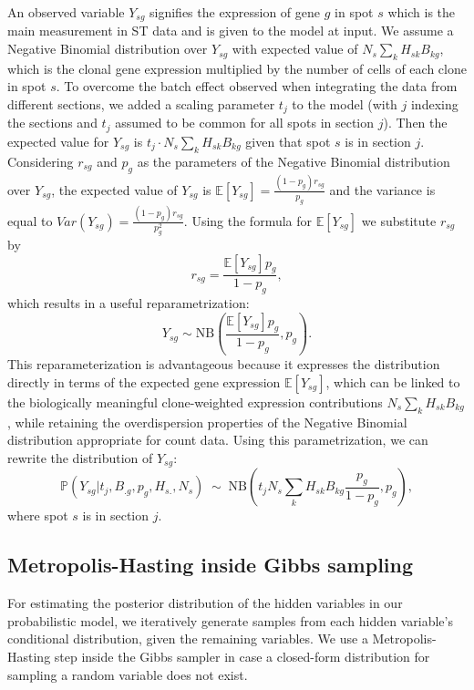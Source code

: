 \documentclass[unnumsec,webpdf,contemporary,large]{oup-authoring-template}%
\theoremstyle{thmstyleone}%
\theoremstyle{thmstyletwo}%
\theoremstyle{thmstylethree}%
\newcommand{\rev}[1]{{\color{revisionblue}#1}}
\begin{document}
\begin{methods}
An observed variable $Y_{sg}$ signifies the expression of gene $g$ in spot $s$ which is the main measurement in ST data and is given to the model at input. We assume a Negative Binomial distribution over $Y_{sg}$ with expected value of $N_s\sum_{k}{H_{sk}B_{kg}}$, which is the clonal gene expression multiplied by the number of cells of each clone in spot $s$. To overcome the batch effect observed when integrating the data from different sections, we added a scaling parameter $t_j$ to the model (with $j$ indexing the sections and $t_j$  assumed to be common for all spots in  section $j$). Then the expected value for $Y_{sg}$ is $t_j \cdot N_s\sum_{k}{H_{sk}B_{kg}}$ given that spot $s$ is in section $j$. Considering $r_{sg}$ and $p_{g}$ as the parameters of the Negative Binomial distribution over $Y_{sg}$, the expected value of $Y_{sg}$ is $\mathbb{E}[Y_{sg}] = \frac{(1-p_{g})r_{sg}}{p_{g}}$ and the variance is equal to $Var(Y_{sg}) = \frac{(1-p_{g})r_{sg}}{p_{g}^2}$. Using the formula for $\mathbb{E}[Y_{sg}]$ we substitute $r_{sg}$ by
$$r_{sg} =\frac{\mathbb{E}[Y_{sg}]p_{g}}{1-p_{g}},$$
which results in a useful reparametrization:
\begin{equation} \label{eq:NB}
Y_{sg} \sim \mathrm{NB}\left(\frac{\mathbb{E}[Y_{sg}]p_{g}}{1-p_{g}}, p_{g}\right).
\end{equation}
\rev{This reparameterization is advantageous because it expresses the distribution directly in terms of the expected gene expression $\mathbb{E}[Y_{sg}]$, which can be linked to the biologically meaningful clone-weighted expression contributions $N_s\sum_{k}{H_{sk}B_{kg}}$, while retaining the overdispersion properties of the Negative Binomial distribution appropriate for count data.}
Using this parametrization, we can rewrite the distribution of $Y_{sg}$:
$$\mathbb{P}(Y_{sg}|t_j, B_{.g},p_g,H_{s.},N_s) \; \sim \; \mathrm{NB} \left(t_j N_s\sum_{k}{H_{sk}B_{kg}}\frac{p_g}{1-p_g},p_g\right),$$
where spot $s$ is in section $j$.

\subsection*{Metropolis-Hasting inside Gibbs sampling}
For estimating the posterior distribution of the hidden variables in our probabilistic model, we iteratively generate samples from each hidden variable's conditional distribution, given the remaining variables. We use a Metropolis-Hasting step inside the Gibbs sampler in case a closed-form distribution for sampling a random variable does not exist. 


\end{methods}
\end{document}
